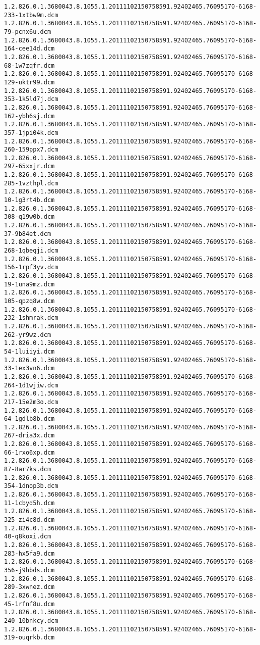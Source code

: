 \begin{lstlisting}
1.2.826.0.1.3680043.8.1055.1.20111102150758591.92402465.76095170-6168-233-1xtbw9m.dcm 1.2.826.0.1.3680043.8.1055.1.20111102150758591.92402465.76095170-6168-79-pcnx6u.dcm 1.2.826.0.1.3680043.8.1055.1.20111102150758591.92402465.76095170-6168-164-cee14d.dcm 1.2.826.0.1.3680043.8.1055.1.20111102150758591.92402465.76095170-6168-68-1w7zqfr.dcm 1.2.826.0.1.3680043.8.1055.1.20111102150758591.92402465.76095170-6168-129-uktr99.dcm 1.2.826.0.1.3680043.8.1055.1.20111102150758591.92402465.76095170-6168-353-1k5ld7j.dcm 1.2.826.0.1.3680043.8.1055.1.20111102150758591.92402465.76095170-6168-162-ybh6sj.dcm 1.2.826.0.1.3680043.8.1055.1.20111102150758591.92402465.76095170-6168-357-1jpi04k.dcm 1.2.826.0.1.3680043.8.1055.1.20111102150758591.92402465.76095170-6168-260-159ppx7.dcm 1.2.826.0.1.3680043.8.1055.1.20111102150758591.92402465.76095170-6168-297-65xxjr.dcm 1.2.826.0.1.3680043.8.1055.1.20111102150758591.92402465.76095170-6168-285-1vzthpl.dcm 1.2.826.0.1.3680043.8.1055.1.20111102150758591.92402465.76095170-6168-10-1g3rt4b.dcm 1.2.826.0.1.3680043.8.1055.1.20111102150758591.92402465.76095170-6168-308-q19w0b.dcm 1.2.826.0.1.3680043.8.1055.1.20111102150758591.92402465.76095170-6168-37-9b84et.dcm 1.2.826.0.1.3680043.8.1055.1.20111102150758591.92402465.76095170-6168-268-1qbeqji.dcm 1.2.826.0.1.3680043.8.1055.1.20111102150758591.92402465.76095170-6168-156-1rpf3yv.dcm 1.2.826.0.1.3680043.8.1055.1.20111102150758591.92402465.76095170-6168-19-1una9mz.dcm 1.2.826.0.1.3680043.8.1055.1.20111102150758591.92402465.76095170-6168-105-qpzq8w.dcm 1.2.826.0.1.3680043.8.1055.1.20111102150758591.92402465.76095170-6168-232-1shmrak.dcm 1.2.826.0.1.3680043.8.1055.1.20111102150758591.92402465.76095170-6168-262-yr9wz.dcm 1.2.826.0.1.3680043.8.1055.1.20111102150758591.92402465.76095170-6168-54-1luiiyi.dcm 1.2.826.0.1.3680043.8.1055.1.20111102150758591.92402465.76095170-6168-33-1ex3vn6.dcm 1.2.826.0.1.3680043.8.1055.1.20111102150758591.92402465.76095170-6168-264-1d1wjiw.dcm 1.2.826.0.1.3680043.8.1055.1.20111102150758591.92402465.76095170-6168-217-15e2m3o.dcm 1.2.826.0.1.3680043.8.1055.1.20111102150758591.92402465.76095170-6168-64-1gdlb8b.dcm 1.2.826.0.1.3680043.8.1055.1.20111102150758591.92402465.76095170-6168-267-dria3x.dcm 1.2.826.0.1.3680043.8.1055.1.20111102150758591.92402465.76095170-6168-66-1rxo6xp.dcm 1.2.826.0.1.3680043.8.1055.1.20111102150758591.92402465.76095170-6168-87-8ar7ks.dcm 1.2.826.0.1.3680043.8.1055.1.20111102150758591.92402465.76095170-6168-354-1dnop3b.dcm 1.2.826.0.1.3680043.8.1055.1.20111102150758591.92402465.76095170-6168-11-1cbyd5h.dcm 1.2.826.0.1.3680043.8.1055.1.20111102150758591.92402465.76095170-6168-325-zi4c8d.dcm 1.2.826.0.1.3680043.8.1055.1.20111102150758591.92402465.76095170-6168-40-q8koxi.dcm 1.2.826.0.1.3680043.8.1055.1.20111102150758591.92402465.76095170-6168-283-hx5fa9.dcm 1.2.826.0.1.3680043.8.1055.1.20111102150758591.92402465.76095170-6168-356-j9hbds.dcm 1.2.826.0.1.3680043.8.1055.1.20111102150758591.92402465.76095170-6168-289-3xwnez.dcm 1.2.826.0.1.3680043.8.1055.1.20111102150758591.92402465.76095170-6168-45-1rfnf8u.dcm 1.2.826.0.1.3680043.8.1055.1.20111102150758591.92402465.76095170-6168-240-10bnkcy.dcm 1.2.826.0.1.3680043.8.1055.1.20111102150758591.92402465.76095170-6168-319-ouqrkb.dcm 
\end{lstlisting}
